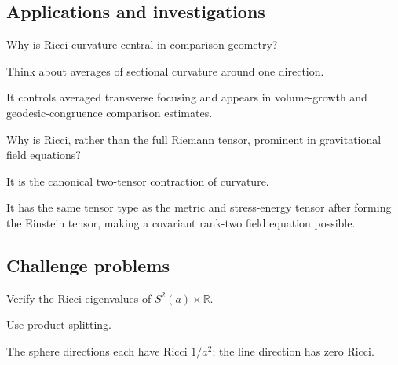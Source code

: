 \subsection*{Applications and investigations}

\begin{exercise}\label{exr:vii27-ped-13}
Why is Ricci curvature central in comparison geometry?
\end{exercise}

\begin{hint}
Think about averages of sectional curvature around one direction.
\end{hint}

\begin{solution}
It controls averaged transverse focusing and appears in volume-growth and geodesic-congruence comparison estimates.
\end{solution}

\begin{exercise}\label{exr:vii27-ped-14}
Why is Ricci, rather than the full Riemann tensor, prominent in gravitational field equations?
\end{exercise}

\begin{hint}
It is the canonical two-tensor contraction of curvature.
\end{hint}

\begin{solution}
It has the same tensor type as the metric and stress-energy tensor after forming the Einstein tensor, making a covariant rank-two field equation possible.
\end{solution}

\subsection*{Challenge problems}

\begin{exercise}\label{exr:vii27-ped-15}
Verify the Ricci eigenvalues of \(S^2(a)\times\mathbb R\).
\end{exercise}

\begin{hint}
Use product splitting.
\end{hint}

\begin{solution}
The sphere directions each have Ricci \(1/a^2\); the line direction has zero Ricci.
\end{solution}

